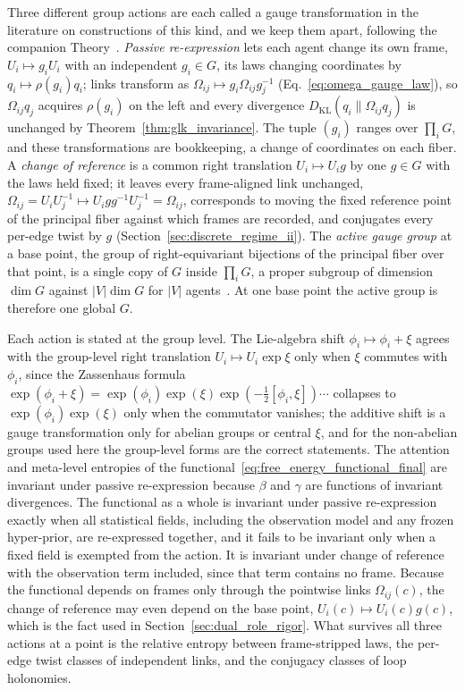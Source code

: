 \documentclass[11pt]{article}
\begin{document}
Three different group actions are each called a gauge transformation in the literature on constructions of this kind, and we keep them apart, following the companion Theory~\cite[Ch.~2]{DennisGaugeVFE2026}. \emph{Passive re-expression} lets each agent change its own frame, $U_i \mapsto g_iU_i$ with an independent $g_i \in G$, its laws changing coordinates by $q_i \mapsto \rho(g_i)q_i$; links transform as $\Omega_{ij} \mapsto g_i\Omega_{ij}g_j^{-1}$ (Eq.~\eqref{eq:omega_gauge_law}), so $\Omega_{ij}q_j$ acquires $\rho(g_i)$ on the left and every divergence $D_{\mathrm{KL}}(q_i \| \Omega_{ij}q_j)$ is unchanged by Theorem~\ref{thm:glk_invariance}. The tuple $(g_i)$ ranges over $\prod_i G$, and these transformations are bookkeeping, a change of coordinates on each fiber. A \emph{change of reference} is a common right translation $U_i \mapsto U_ig$ by one $g \in G$ with the laws held fixed; it leaves every frame-aligned link unchanged, $\Omega_{ij} = U_iU_j^{-1} \mapsto U_igg^{-1}U_j^{-1} = \Omega_{ij}$, corresponds to moving the fixed reference point of the principal fiber against which frames are recorded, and conjugates every per-edge twist by $g$ (Section~\ref{sec:discrete_regime_ii}). The \emph{active gauge group} at a base point, the group of right-equivariant bijections of the principal fiber over that point, is a single copy of $G$ inside $\prod_i G$, a proper subgroup of dimension $\dim G$ against $|V|\dim G$ for $|V|$ agents~\cite[Ch.~2]{DennisGaugeVFE2026}. At one base point the active group is therefore one global $G$.

Each action is stated at the group level. The Lie-algebra shift $\phi_i \mapsto \phi_i + \xi$ agrees with the group-level right translation $U_i \mapsto U_i\exp\xi$ only when $\xi$ commutes with $\phi_i$, since the Zassenhaus formula $\exp(\phi_i + \xi) = \exp(\phi_i)\exp(\xi)\exp(-\tfrac12 [\phi_i, \xi])\cdots$ collapses to $\exp(\phi_i)\exp(\xi)$ only when the commutator vanishes; the additive shift is a gauge transformation only for abelian groups or central $\xi$, and for the non-abelian groups used here the group-level forms are the correct statements. The attention and meta-level entropies of the functional~\eqref{eq:free_energy_functional_final} are invariant under passive re-expression because $\beta$ and $\gamma$ are functions of invariant divergences. The functional as a whole is invariant under passive re-expression exactly when all statistical fields, including the observation model and any frozen hyper-prior, are re-expressed together, and it fails to be invariant only when a fixed field is exempted from the action. It is invariant under change of reference with the observation term included, since that term contains no frame. Because the functional depends on frames only through the pointwise links $\Omega_{ij}(c)$, the change of reference may even depend on the base point, $U_i(c) \mapsto U_i(c)g(c)$, which is the fact used in Section~\ref{sec:dual_role_rigor}. What survives all three actions at a point is the relative entropy between frame-stripped laws, the per-edge twist classes of independent links, and the conjugacy classes of loop holonomies.
\end{document}
